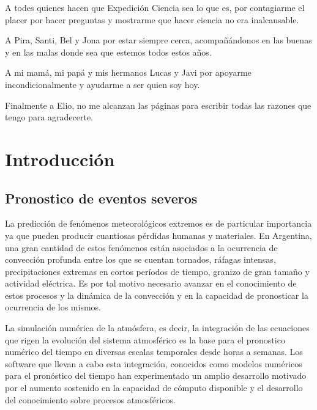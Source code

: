 \documentclass[12pt,oneside,a4paper]{reedthesis}
\begin{document}
\begin{acknowledgements}
    A todes quienes hacen que Expedición Ciencia sea lo que es, por contagiarme el placer por hacer preguntas y mostrarme que hacer ciencia no era inalcansable.
    
    A Pira, Santi, Bel y Jona por estar siempre cerca, acompañándonos en las buenas y en las malas donde sea que estemos todos estos años.
    
    A mi mamá, mi papá y mis hermanos Lucas y Javi por apoyarme incondicionalmente y ayudarme a ser quien soy hoy.
    
    Finalmente a Elio, no me alcanzan las páginas para escribir todas las razones que tengo para agradecerte.
  \end{acknowledgements}
  \hypersetup{linkcolor=black}
  \setcounter{secnumdepth}{5}
  \setcounter{tocdepth}{5}
  \tableofcontents

  \listoftables

  \listoffigures

\mainmatter %
\pagestyle{fancyplain} %

\hypertarget{introducciuxf3n}{%
\chapter{Introducción}\label{introducciuxf3n}}

\hypertarget{pronostico-de-eventos-severos}{%
\section{Pronostico de eventos severos}\label{pronostico-de-eventos-severos}}

La predicción de fenómenos meteorológicos extremos es de particular importancia ya que pueden producir cuantiosas pérdidas humanas y materiales. En Argentina, una gran cantidad de estos fenómenos están asociados a la ocurrencia de convección profunda entre los que se cuentan tornados, ráfagas intensas, precipitaciones extremas en cortos períodos de tiempo, granizo de gran tamaño y actividad eléctrica. Es por tal motivo necesario avanzar en el conocimiento de estos procesos y la dinámica de la convección y en la capacidad de pronosticar la ocurrencia de los mismos.

La simulación numérica de la atmósfera, es decir, la integración de las ecuaciones que rigen la evolución del sistema atmosférico es la base para el pronostico numérico del tiempo en diversas escalas temporales desde horas a semanas. Los software que llevan a cabo esta integración, conocidos como modelos numéricos para el pronóstico del tiempo han experimentado un amplio desarrollo motivado por el aumento sostenido en la capacidad de cómputo disponible y el desarrollo del conocimiento sobre procesos atmosféricos.
\end{document}
